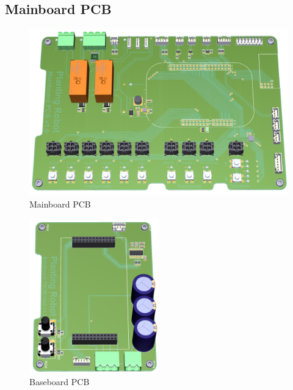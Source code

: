 \subsection{Mainboard PCB}

\begin{figure}[H]
	\includegraphics[width=1\textwidth]{Illustrationen/6-Umsetzung/Mainboard_3D.png}
	\caption{Mainboard PCB}
	\label{fig:Mainboard_3D}
\end{figure}

\begin{figure}[H]
	\includegraphics[width=0.5\textwidth]{Illustrationen/6-Umsetzung/Baseboard_3D_2.png}
	\caption{Baseboard PCB}
	\label{fig:Baseboard_3D}
\end{figure}



